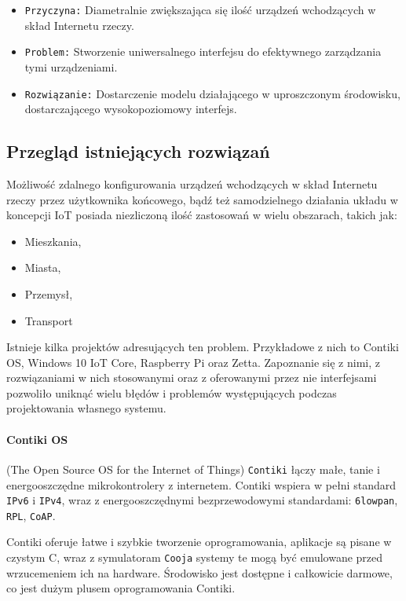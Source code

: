 \begin{itemize}
	\item \texttt{Przyczyna:} Diametralnie zwiększająca się ilość urządzeń wchodzących w skład Internetu rzeczy\cite{iot-art}.
	\item \texttt{Problem:} Stworzenie uniwersalnego interfejsu do efektywnego zarządzania tymi urządzeniami.
	\item \texttt{Rozwiązanie:} Dostarczenie modelu działającego w uproszczonym środowisku, dostarczającego wysokopoziomowy interfejs.
\end{itemize}

\subsection{Przegląd istniejących rozwiązań}
\label{sec:existing-systems}
Możliwość zdalnego konfigurowania urządzeń wchodzących w skład Internetu rzeczy przez użytkownika końcowego, bądź też samodzielnego działania układu w koncepcji IoT posiada niezliczoną ilość zastosowań w wielu obszarach, takich jak:

 \begin{itemize}
	\item Mieszkania,
	\item Miasta,
	\item Przemysł,
	\item Transport
\end{itemize}

Istnieje kilka projektów adresujących ten problem. Przykładowe z nich to Contiki OS, Windows 10 IoT Core, Raspberry Pi oraz Zetta. Zapoznanie się z nimi, z rozwiązaniami w nich stosowanymi oraz z oferowanymi przez nie interfejsami pozwoliło uniknąć wielu błędów i problemów występujących podczas projektowania własnego systemu.

\paragraph{Contiki OS}\cite{contiki-www} (The Open Source OS for the Internet of Things) \texttt{Contiki} łączy małe, tanie i energooszczędne mikrokontrolery z internetem. Contiki wspiera w pełni standard \texttt{IPv6} i \texttt{IPv4}, wraz z energooszczędnymi bezprzewodowymi standardami: \texttt{6lowpan}, \texttt{RPL}, \texttt{CoAP}. 

Contiki oferuje łatwe i szybkie tworzenie oprogramowania, aplikacje są pisane w czystym C, wraz z symulatoram \texttt{Cooja} systemy te mogą być emulowane przed wrzucemeniem ich na hardware. Środowisko jest dostępne i całkowicie darmowe, co jest dużym plusem oprogramowania Contiki.

